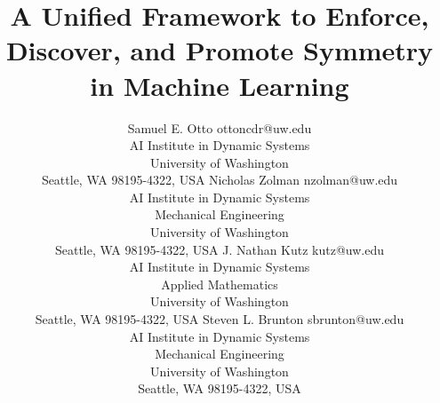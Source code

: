 \documentclass[twoside,11pt]{article}
\begin{document}
\title{\LARGE{\textbf{A Unified Framework to Enforce, Discover, and Promote Symmetry in Machine Learning}}}

\author{
    \name \hspace{-4pt}Samuel E. Otto \email ottoncdr@uw.edu \\
    \addr AI Institute in Dynamic Systems\\
    University of Washington\\
    Seattle, WA 98195-4322, USA
    \AND
    \name Nicholas Zolman \email nzolman@uw.edu \\
    \addr AI Institute in Dynamic Systems\\    
    \addr Mechanical Engineering \\
    University of Washington\\
    Seattle, WA 98195-4322, USA
    \AND
    \name J. Nathan Kutz \email kutz@uw.edu \\
    \addr AI Institute in Dynamic Systems\\
    \addr Applied Mathematics \\
    University of Washington \\
    Seattle, WA 98195-4322, USA
    \AND
    \name Steven L. Brunton \email sbrunton@uw.edu \\
    \addr AI Institute in Dynamic Systems\\
    \addr Mechanical Engineering \\
    University of Washington \\
    Seattle, WA 98195-4322, USA
}


\maketitle
\end{document}
